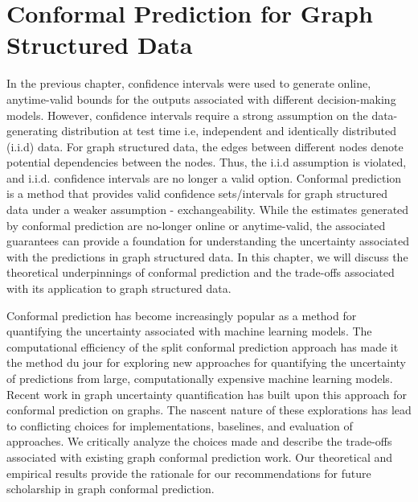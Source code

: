 \chapter{Conformal Prediction for Graph Structured Data}
\label{chp:graphConformal}
In the previous chapter, confidence intervals were used to generate online, anytime-valid bounds for the outputs associated with different decision-making models.
However, confidence intervals require a strong assumption on the data-generating distribution at test time i.e, independent and identically distributed (i.i.d) data.
For graph structured data, the edges between different nodes denote potential dependencies between the nodes.
Thus, the i.i.d assumption is violated, and i.i.d. confidence intervals are no longer a valid option.
Conformal prediction is a method that provides valid confidence sets/intervals for graph structured data under a weaker assumption - exchangeability.
While the estimates generated by conformal prediction are no-longer online or anytime-valid, the associated guarantees can provide a foundation for understanding the uncertainty associated with the predictions in graph structured data.
In this chapter, we will discuss the theoretical underpinnings of conformal prediction and the trade-offs associated with its application to graph structured data.


Conformal prediction has become increasingly popular as a method for quantifying the uncertainty associated with machine learning models. 
The computational efficiency of the split conformal prediction approach has made it the method du jour for exploring new approaches for quantifying the uncertainty of predictions from large, computationally expensive machine learning models.
Recent work in graph uncertainty quantification has built upon this approach for conformal prediction on graphs.
The nascent nature of these explorations has lead to conflicting choices for implementations, baselines, and evaluation of approaches.
We critically analyze the choices made and describe the trade-offs associated with existing graph conformal prediction work. 
Our theoretical and empirical results provide the rationale for our recommendations for future scholarship in graph conformal prediction.

